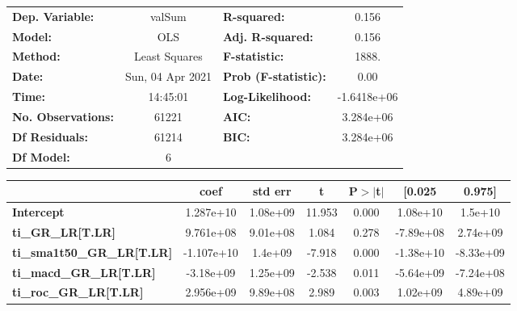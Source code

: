 \begin{center}
\begin{tabular}{lclc}
\toprule
\textbf{Dep. Variable:}                 &      valSum      & \textbf{  R-squared:         } &      0.156   \\
\textbf{Model:}                         &       OLS        & \textbf{  Adj. R-squared:    } &      0.156   \\
\textbf{Method:}                        &  Least Squares   & \textbf{  F-statistic:       } &      1888.   \\
\textbf{Date:}                          & Sun, 04 Apr 2021 & \textbf{  Prob (F-statistic):} &      0.00    \\
\textbf{Time:}                          &     14:45:01     & \textbf{  Log-Likelihood:    } & -1.6418e+06  \\
\textbf{No. Observations:}              &       61221      & \textbf{  AIC:               } &  3.284e+06   \\
\textbf{Df Residuals:}                  &       61214      & \textbf{  BIC:               } &  3.284e+06   \\
\textbf{Df Model:}                      &           6      & \textbf{                     } &              \\
\bottomrule
\end{tabular}
\begin{tabular}{lcccccc}
                                        & \textbf{coef} & \textbf{std err} & \textbf{t} & \textbf{P$> |$t$|$} & \textbf{[0.025} & \textbf{0.975]}  \\
\midrule
\textbf{Intercept}                      &    1.287e+10  &     1.08e+09     &    11.953  &         0.000        &     1.08e+10    &      1.5e+10     \\
\textbf{ti\_GR\_LR[T.LR]}               &    9.761e+08  &     9.01e+08     &     1.084  &         0.278        &    -7.89e+08    &     2.74e+09     \\
\textbf{ti\_sma1t50\_GR\_LR[T.LR]}      &   -1.107e+10  &      1.4e+09     &    -7.918  &         0.000        &    -1.38e+10    &    -8.33e+09     \\
\textbf{ti\_macd\_GR\_LR[T.LR]}         &    -3.18e+09  &     1.25e+09     &    -2.538  &         0.011        &    -5.64e+09    &    -7.24e+08     \\
\textbf{ti\_roc\_GR\_LR[T.LR]}          &    2.956e+09  &     9.89e+08     &     2.989  &         0.003        &     1.02e+09    &     4.89e+09     \\

\end{tabular}
\end{center}
